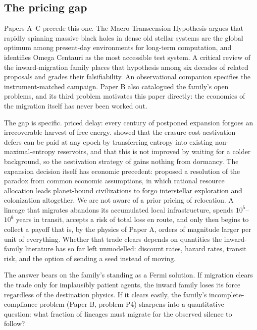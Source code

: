 \documentclass[11pt]{article}
\begin{document}
\subsection{The pricing gap}

Papers A--C precede this one. The Macro Transcension Hypothesis \citep[hereafter Paper A]{Swanson2026MTH} argues that rapidly spinning massive black holes in dense old stellar systems are the global optimum among present-day environments for long-term computation, and identifies Omega Centauri as the most accessible test system. A critical review of the inward-migration family \citep[hereafter Paper B]{Swanson2026Review} places that hypothesis among six decades of related proposals and grades their falsifiability. An observational companion \citep[hereafter Paper C]{Swanson2026Campaign} specifies the instrument-matched campaign. Paper B also catalogued the family's open problems, and its third problem motivates this paper directly: the economics of the migration itself has never been worked out.

The gap is specific. \citet{Bostrom2003} priced delay: every century of postponed expansion forgoes an irrecoverable harvest of free energy. \citet{Bennett2019} showed that the erasure cost aestivation defers can be paid at any epoch by transferring entropy into existing non-maximal-entropy reservoirs, and that this is not improved by waiting for a colder background, so the aestivation strategy of \citet{Sandberg2016} gains nothing from dormancy. The expansion decision itself has economic precedent: \citet{Hosek2007} proposed a resolution of the paradox from common economic assumptions, in which rational resource allocation leads planet-bound civilizations to forgo interstellar exploration and colonization altogether. We are not aware of a prior pricing of relocation. A lineage that migrates abandons its accumulated local infrastructure, spends $10^{5}$--$10^{6}$ years in transit, accepts a risk of total loss en route, and only then begins to collect a payoff that is, by the physics of Paper A, orders of magnitude larger per unit of everything. Whether that trade clears depends on quantities the inward-family literature has so far left unmodelled: discount rates, hazard rates, transit risk, and the option of sending a seed instead of moving.

The answer bears on the family's standing as a Fermi solution. If migration clears the trade only for implausibly patient agents, the inward family loses its force regardless of the destination physics. If it clears easily, the family's incomplete-compliance problem (Paper B, problem P4) sharpens into a quantitative question: what fraction of lineages must migrate for the observed silence to follow?
\end{document}
